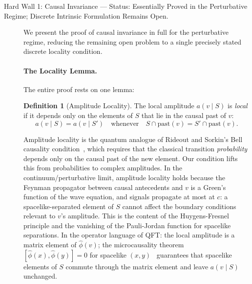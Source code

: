 \documentclass[11pt,a4paper]{article}
\theoremstyle{plain}
\theoremstyle{definition}
\newtheorem{definition}[theorem]{Definition}
\theoremstyle{remark}
\begin{document}
\begin{description}
  \item[Hard Wall 1: Causal Invariance --- Status: Essentially Proved in the
  Perturbative Regime; Discrete Intrinsic Formulation Remains Open.]

  We present the proof of causal invariance in full for the perturbative
  regime, reducing the remaining open problem to a single precisely stated
  discrete locality condition.

  \paragraph{The Locality Lemma.}
  The entire proof rests on one lemma:

  \begin{definition}[Amplitude Locality]
  The local amplitude $a(v \mid S)$ is \emph{local} if it depends only on
  the elements of $S$ that lie in the causal past of $v$:
  \begin{equation}
    a(v \mid S) = a(v \mid S') \quad\text{whenever}\quad
    S \cap \mathrm{past}(v) = S' \cap \mathrm{past}(v).
    \label{eq:locality}
  \end{equation}
  \end{definition}

  Amplitude locality is the quantum analogue of Rideout and Sorkin's Bell
  causality condition~\citep{RideoutSorkin2000}, which requires that the
  classical transition \emph{probability} depends only on the causal past of
  the new element. Our condition lifts this from probabilities to complex
  amplitudes. In the continuum/perturbative limit, amplitude locality holds
  because the Feynman propagator between causal antecedents and $v$ is a
  Green's function of the wave equation, and signals propagate at most at $c$:
  a spacelike-separated element of $S$ cannot affect the boundary conditions
  relevant to $v$'s amplitude. This is the content of the Huygens-Fresnel
  principle and the vanishing of the Pauli-Jordan function for spacelike
  separations. In the operator language of QFT: the local amplitude is a
  matrix element of $\hat{\phi}(v)$; the microcausality theorem
  $[\hat{\phi}(x), \hat{\phi}(y)] = 0$ for spacelike $(x,y)$~\citep{Haag1996}
  guarantees that spacelike elements of $S$ commute through the matrix element
  and leave $a(v \mid S)$ unchanged.


\end{description}
\end{document}
